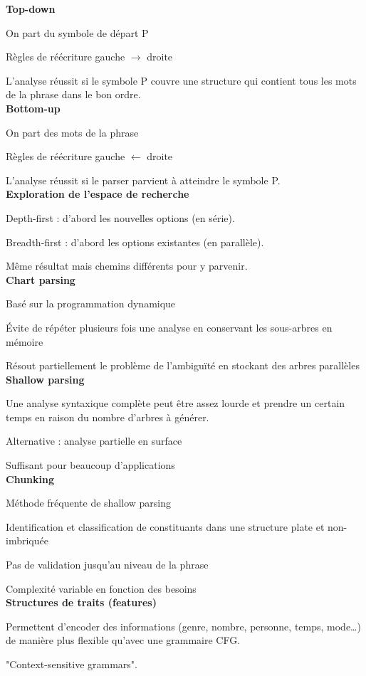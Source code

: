 \textbf{Top-down}

On part du symbole de départ P

Règles de réécriture gauche $\rightarrow$ droite

L'analyse réussit si le symbole P couvre une structure qui contient tous les mots de la phrase dans le bon ordre.\\

\textbf{Bottom-up}

On part des mots de la phrase

Règles de réécriture gauche $\leftarrow$ droite

L'analyse réussit si le parser parvient à atteindre le symbole P.\\


\textbf{Exploration de l'espace de recherche}

Depth-first : d'abord les nouvelles options (en série).

Breadth-first : d'abord les options existantes (en parallèle).

Même résultat mais chemins différents pour y parvenir.\\

\textbf{Chart parsing}

Basé sur la programmation dynamique

Évite de répéter plusieurs fois une analyse en conservant les sous-arbres en mémoire

Résout partiellement le problème de l'ambiguïté en stockant des arbres parallèles\\

\textbf{Shallow parsing}

Une analyse syntaxique complète peut être assez lourde et prendre un certain temps en raison du nombre d'arbres à générer.

Alternative : analyse partielle en surface

Suffisant pour beaucoup d'applications\\

\textbf{Chunking}

Méthode fréquente de shallow parsing

Identification et classification de constituants dans une structure plate et non-imbriquée

Pas de validation jusqu'au niveau de la phrase

Complexité variable en fonction des besoins\\

\textbf{Structures de traits (features)}

Permettent d'encoder des informations (genre, nombre, personne, temps, mode…) de manière plus flexible qu'avec une grammaire CFG.

"Context-sensitive grammars".\\
